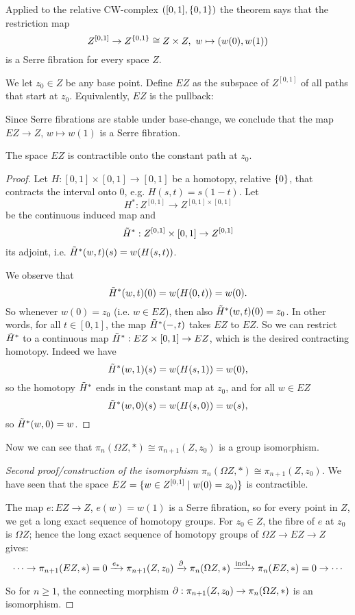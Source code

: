 Applied to the relative CW-complex $([0,1],\{0,1\})$ the theorem says that the restriction map
\[Z^{[0,1]}\to Z^{\{0,1\}}\cong Z\times Z,\ w\mapsto (w(0),w(1))\]
is a Serre fibration for every space $Z$.

We let $z_0\in Z$ be any base point. Define $EZ$ as the subspace of $Z^{[0,1]}$ of all paths that start at $z_0$. Equivalently, $EZ$ is the pullback:
\begin{center}
\end{center}

Since Serre fibrations are stable under base-change, we conclude that the map $EZ\to Z$, $w\mapsto w(1)$ is a Serre fibration.

\begin{theorem}\label{theorem:EZ-contractible}
The space $EZ$ is contractible onto the constant path at $z_0$.
\end{theorem}

\begin{proof}
Let $H:[0,1]\times[0,1]\to[0,1]$ be a homotopy, relative $\{0\}$, that contracts the interval onto $0$, e.g. $H(s,t)=s(1-t)$. Let
\[H^*:Z^{[0,1]}\to Z^{[0,1]\times[0,1]}\]
be the continuous induced map and
\[\tilde H^*:Z^{[0,1]}\times[0,1]\to Z^{[0,1]}\]
its adjoint, i.e. $\tilde H^*(w,t)(s)=w(H(s,t))$.

We observe that
\[\tilde H^*(w,t)(0)=w(H(0,t))=w(0).\]
So whenever $w(0)=z_0$ (i.e. $w\in EZ$), then also $\tilde H^*(w,t)(0)=z_0$. In other words, for all $t\in[0,1]$, the map $\tilde H^*(-,t)$ takes $EZ$ to $EZ$. So we can restrict $\tilde H^*$ to a continuous map $\tilde H^*:EZ\times[0,1]\to EZ$, which is the desired contracting homotopy. Indeed we have
\[\tilde H^*(w,1)(s)=w(H(s,1))=w(0),\]
so the homotopy $\tilde H^*$ ends in the constant map at $z_0$, and for all $w\in EZ$
\[\tilde H^*(w,0)(s)=w(H(s,0))=w(s),\]
so $\tilde H^*(w,0)=w$.
\end{proof} 

Now we can see that $\pi_n(\Omega Z,*)\cong\pi_{n+1}(Z,z_0)$ is a group isomorphism.

\begin{proof}[Second proof/construction of the isomorphism $\pi_n(\Omega Z,*)\cong\pi_{n+1}(Z,z_0)$]

We have seen that the space $EZ=\{w\in Z^{[0,1]}\mid w(0)=z_0)\}$ is contractible.

The map $e:EZ\to Z$, $e(w)=w(1)$ is a Serre fibration, so for every point in $Z$, we get a long exact sequence of homotopy groups. For $z_0\in Z$, the fibre of $e$ at $z_0$ is $\Omega Z$; hence the long exact sequence of homotopy groups of $\Omega Z\to EZ\to Z$ gives:
\[\dots\to\pi_{n+1}(EZ,*)=0\xrightarrow{e_*}\pi_{n+1}(Z,z_0)\xrightarrow{\partial}\pi_n(\Omega Z,*)\xrightarrow{\operatorname{incl}_*}\pi_n(EZ,*)=0\to\cdots\]

So for $n\geq 1$, the connecting morphism $\partial:\pi_{n+1}(Z,z_0)\to\pi_n(\Omega Z,*)$ is an isomorphism.
\end{proof}

